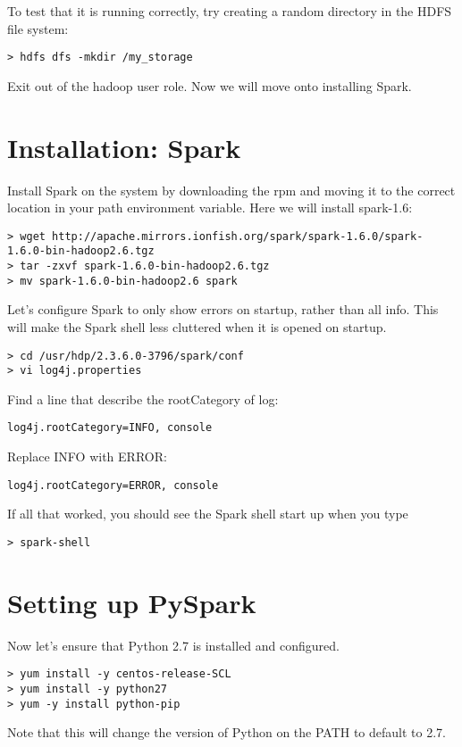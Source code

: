\documentclass[9pt,twocolumn,twoside]{idsi}
\begin{document}
To test that it is running correctly, try creating a random directory in the HDFS file system:
\begin{verbatim}
> hdfs dfs -mkdir /my_storage
\end{verbatim}

Exit out of the hadoop user role. Now we will move onto installing Spark.

\section{Installation: Spark}
\noindent
Install Spark on the system by downloading the rpm and moving it to the correct location in your path environment variable. Here we will install spark-1.6:
\begin{lstlisting}[breaklines]
> wget http://apache.mirrors.ionfish.org/spark/spark-1.6.0/spark-1.6.0-bin-hadoop2.6.tgz
> tar -zxvf spark-1.6.0-bin-hadoop2.6.tgz
> mv spark-1.6.0-bin-hadoop2.6 spark
\end{lstlisting}

\noindent
Let's configure Spark to only show errors on startup, rather than all info. This will make the Spark shell less cluttered when it is opened on startup.
\begin{verbatim}
> cd /usr/hdp/2.3.6.0-3796/spark/conf
> vi log4j.properties
\end{verbatim}

\noindent
Find a line that describe the rootCategory of log:
\begin{verbatim}
log4j.rootCategory=INFO, console
\end{verbatim}

Replace INFO with ERROR:
\begin{verbatim}
log4j.rootCategory=ERROR, console
\end{verbatim}

If all that worked, you should see the Spark shell start up when you type
\begin{verbatim}
> spark-shell
\end{verbatim}

\section{Setting up PySpark}

Now let's ensure that Python 2.7 is installed and configured.
\begin{verbatim}
> yum install -y centos-release-SCL
> yum install -y python27
> yum -y install python-pip
\end{verbatim}
Note that this will change the version of Python on the PATH to default to 2.7.
\end{document}
